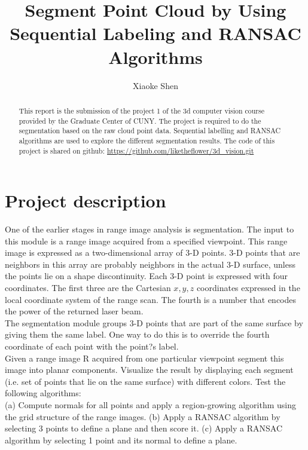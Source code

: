 \documentclass[a4paper,12pt]{article}
\title {Segment Point Cloud by Using Sequential Labeling and RANSAC Algorithms }
\author{Xiaoke Shen}
\affil{The Graduate Center, City University of New York}
\date{}
\begin{document}
\maketitle
\begin{abstract}
This report is the submission of the project 1 of the 3d computer vision course provided by the Graduate Center of CUNY. The project is required to do the segmentation based on the raw cloud point data. Sequential labelling and RANSAC algorithms are used to explore the different segmentation results. The code of this project is shared on github: \url{https://github.com/liketheflower/3d_vision.git}

\end{abstract}


\section{Project description}
One of the earlier stages in range image analysis is segmentation. The input to this
module is a range image acquired from a specified viewpoint. This range image is
expressed as a two-dimensional array of 3-D points. 3-D points that are neighbors in this
array are probably neighbors in the actual 3-D surface, unless the points lie on a shape
discontinuity. Each 3-D point is expressed with four coordinates. The first three are the
Cartesian $x, y, z$ coordinates expressed in the local coordinate system of the range scan.
The fourth is a number that encodes the power of the returned laser beam.\\
The segmentation module groups 3-D points that are part of the same surface by giving
them the same label. One way to do this is to override the fourth coordinate of each point
with the point?s label.\\
Given a range image R acquired from one particular viewpoint segment this image into
planar components. Visualize the result by displaying each segment (i.e. set of points that
lie on the same surface) with different colors.
Test the following algorithms:\\

(a) Compute normals for all points and apply a region-growing algorithm using the grid structure of the range images.
(b) Apply a RANSAC algorithm by selecting 3 points to define a plane and then score it.
(c) Apply a RANSAC algorithm by selecting 1 point and its normal to define a plane.
\end{document}
